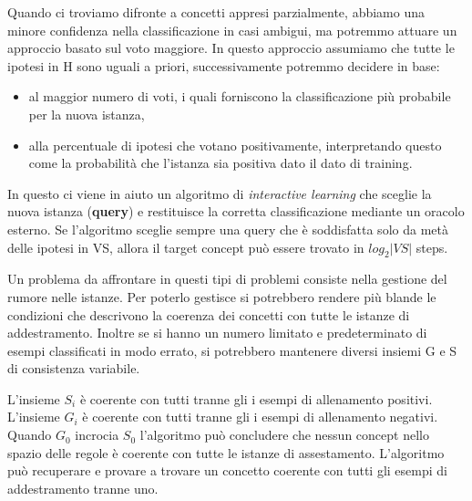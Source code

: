 \documentclass[a4paper]{extarticle}
\begin{document}
Quando ci troviamo difronte a concetti appresi parzialmente, abbiamo una minore confidenza nella classificazione in casi ambigui, ma potremmo attuare un approccio basato sul voto maggiore. In questo approccio assumiamo che tutte le ipotesi in H sono uguali a priori, successivamente potremmo decidere in base:

\begin{itemize}
\item al maggior numero di voti, i quali forniscono la classificazione più probabile per la nuova istanza,
\item alla percentuale di ipotesi che votano positivamente, interpretando questo come la probabilità che l'istanza sia positiva dato il dato di training.
\end{itemize}

In questo ci viene in aiuto un algoritmo di \textit{interactive learning} che sceglie la nuova istanza (\textbf{query}) e restituisce la corretta classificazione mediante un oracolo esterno. Se l'algoritmo sceglie sempre una query che è soddisfatta solo da metà delle ipotesi in VS, allora il target concept può essere trovato in $log_2 |VS|$ steps.

Un problema da affrontare in questi tipi di problemi consiste nella gestione del rumore nelle istanze. Per poterlo gestisce si potrebbero rendere più blande le condizioni che descrivono la coerenza dei concetti con tutte le istanze di addestramento. Inoltre se si hanno un numero limitato e predeterminato di esempi classificati in modo errato, si potrebbero mantenere diversi insiemi G e S di consistenza variabile.

\begin{center}


\end{center}

L'insieme $S_i$ è coerente con tutti tranne gli i esempi di allenamento positivi. L'insieme $G_i$ è coerente con tutti tranne gli i esempi di allenamento negativi. Quando $G_0$ incrocia $S_0$ l'algoritmo può concludere che nessun concept nello spazio delle regole è coerente con tutte le istanze di assestamento. L'algoritmo può recuperare e provare a trovare un concetto coerente con tutti gli esempi di addestramento tranne uno.
\end{document}
